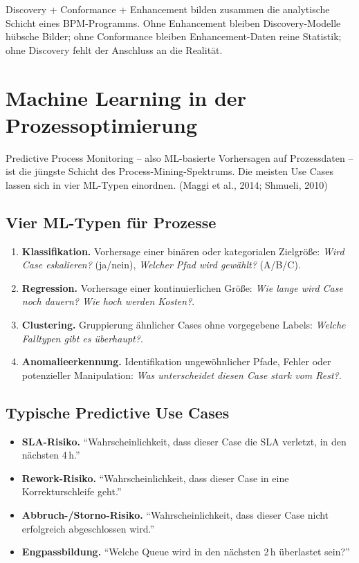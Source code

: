 \documentclass[11pt,a4paper,oneside]{article}
\newcommand{\fachbegriff}[1]{\textbf{#1}}
\newcommand{\quelle}[1]{{\footnotesize\color{lpGray}(#1)}}
\begin{document}
\begin{merkbox}
Discovery + Conformance + Enhancement bilden zusammen die analytische Schicht eines BPM-Programms. Ohne Enhancement bleiben Discovery-Modelle hübsche Bilder; ohne Conformance bleiben Enhancement-Daten reine Statistik; ohne Discovery fehlt der Anschluss an die Realität.
\end{merkbox}

\section{Machine Learning in der Prozessoptimierung}

Predictive Process Monitoring -- also ML-basierte Vorhersagen auf Prozessdaten -- ist die jüngste Schicht des Process-Mining-Spektrums. Die meisten Use Cases lassen sich in vier ML-Typen einordnen. \quelle{Maggi et al., 2014; Shmueli, 2010}

\subsection{Vier ML-Typen für Prozesse}

\begin{enumerate}
  \item \fachbegriff{Klassifikation.} Vorhersage einer binären oder kategorialen Zielgröße: \emph{Wird Case eskalieren?} (ja/nein), \emph{Welcher Pfad wird gewählt?} (A/B/C).
  \item \fachbegriff{Regression.} Vorhersage einer kontinuierlichen Größe: \emph{Wie lange wird Case noch dauern? Wie hoch werden Kosten?}.
  \item \fachbegriff{Clustering.} Gruppierung ähnlicher Cases ohne vorgegebene Labels: \emph{Welche Falltypen gibt es überhaupt?}.
  \item \fachbegriff{Anomalieerkennung.} Identifikation ungewöhnlicher Pfade, Fehler oder potenzieller Manipulation: \emph{Was unterscheidet diesen Case stark vom Rest?}.
\end{enumerate}

\subsection{Typische Predictive Use Cases}

\begin{itemize}
  \item \fachbegriff{SLA-Risiko.} ``Wahrscheinlichkeit, dass dieser Case die SLA verletzt, in den nächsten 4\,h.''
  \item \fachbegriff{Rework-Risiko.} ``Wahrscheinlichkeit, dass dieser Case in eine Korrekturschleife geht.''
  \item \fachbegriff{Abbruch-/Storno-Risiko.} ``Wahrscheinlichkeit, dass dieser Case nicht erfolgreich abgeschlossen wird.''
  \item \fachbegriff{Engpassbildung.} ``Welche Queue wird in den nächsten 2\,h überlastet sein?''
\end{itemize}
\end{document}
